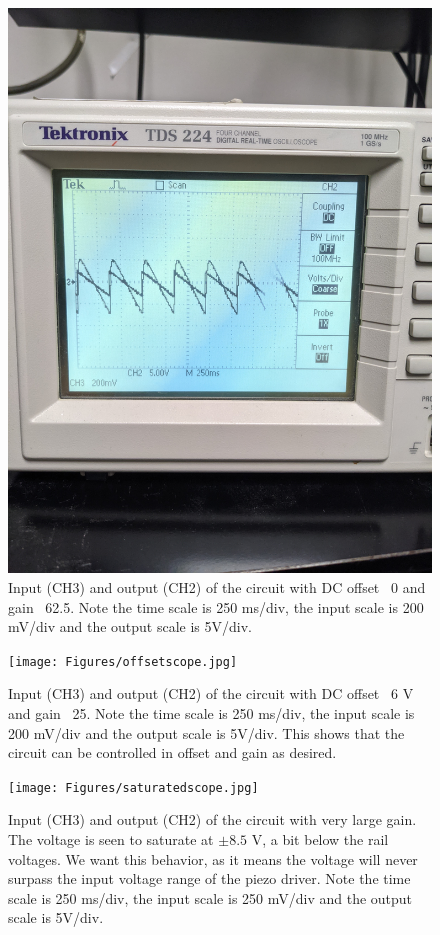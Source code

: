 \documentclass{article}
\begin{document}
\begin{figure}
\centering
\includegraphics[width=\textwidth,angle=-90,origin=c]{Figures/overlayscope.jpg}
\caption{Input (CH3) and output (CH2) of the circuit with DC offset ~0 and gain ~62.5. Note the time scale is 250 ms/div, the input scale is 200 mV/div and the output scale is 5V/div.}
\label{samplenormal}
\end{figure}

\begin{figure}
\centering
\texttt{[image: Figures/offsetscope.jpg]}
\caption{Input (CH3) and output (CH2) of the circuit with DC offset ~6 V and gain ~25. Note the time scale is 250 ms/div, the input scale is 200 mV/div and the output scale is 5V/div. This shows that the circuit can be controlled in offset and gain as desired.}
\label{sampleoffset}
\end{figure}


\begin{figure}
\centering
\texttt{[image: Figures/saturatedscope.jpg]}
\caption{Input (CH3) and output (CH2) of the circuit with very large gain. The voltage is seen to saturate at $\pm 8.5$ V, a bit below the rail voltages. We want this behavior, as it means the voltage will never surpass the input voltage range of the piezo driver. Note the time scale is 250 ms/div, the input scale is 250 mV/div and the output scale is 5V/div.}
\label{samplesaturated}
\end{figure}
\end{document}

